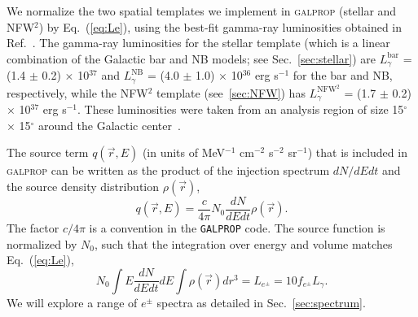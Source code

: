 \documentclass[doublespace,nopageskip]{VTthesis} %
\begin{document}
We normalize the two spatial templates we implement in \textsc{galprop} (stellar and NFW$^2$) by Eq.~(\ref{eq:Le}), using the best-fit gamma-ray luminosities obtained in Ref.~\cite{Macias:2016nev}. The gamma-ray luminosities for the stellar template (which is a linear combination of the Galactic bar and NB models; see Sec.~\ref{sec:stellar}) are $L^{\text{bar}}_\gamma$ = (1.4 $\pm$ 0.2) $\times$ 10$^{37}$ and $L^{\text{NB}}_\gamma$ = (4.0 $\pm$ 1.0) $\times$ 10$^{36}$ erg s$^{-1}$ for the bar and NB, respectively, while the NFW$^2$ template (see~\ref{sec:NFW}) has $L^{\text{NFW}^2}_\gamma$ = (1.7 $\pm$ 0.2) $\times$ 10$^{37}$ erg s$^{-1}$. These luminosities were taken from an analysis region of size 15$^\circ$ $\times$ 15$^\circ$ around the Galactic center~\cite{Macias:2016nev}.

The source term $q(\vec{r},E)$ (in units of  MeV$^{-1}$ cm$^{-2}$ s$^{-2}$ sr$^{-1}$) that is included in \textsc{galprop} can be written as the product of the injection spectrum $dN/dEdt$ and the source density distribution $\rho(\vec{r})$,
\begin{equation}
  q(\vec{r},E) = \frac{c}{4\pi} N_0 \dfrac{dN}{dEdt}\rho(\vec{r}).
\end{equation}
The factor $c/4\pi$ is a convention in the {\tt GALPROP} code. The source function is normalized by $N_0$, such that the integration over energy and volume matches Eq.~(\ref{eq:Le}),
\begin{equation}
  \label{eq:norm}
  N_0 \int E\dfrac{dN}{dEdt}dE \int\rho(\vec{r})dr^3 = L_{e^\pm} = 10 f_{e^\pm} L_\gamma.
\end{equation}
We will explore a range of $e^\pm$ spectra as detailed in Sec.~\ref{sec:spectrum}.
\end{document}
